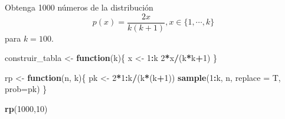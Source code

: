 \documentclass[]{article}
\newenvironment{Shaded}{\begin{snugshade}}{\end{snugshade}}
\newcommand{\ControlFlowTok}[1]{\textcolor[rgb]{0.13,0.29,0.53}{\textbf{#1}}}
\newcommand{\DataTypeTok}[1]{\textcolor[rgb]{0.13,0.29,0.53}{#1}}
\newcommand{\DecValTok}[1]{\textcolor[rgb]{0.00,0.00,0.81}{#1}}
\newcommand{\KeywordTok}[1]{\textcolor[rgb]{0.13,0.29,0.53}{\textbf{#1}}}
\newcommand{\NormalTok}[1]{#1}
\newcommand{\OperatorTok}[1]{\textcolor[rgb]{0.81,0.36,0.00}{\textbf{#1}}}
\newcommand{\StringTok}[1]{\textcolor[rgb]{0.31,0.60,0.02}{#1}}
\begin{document}
Obtenga 1000 números de la distribución \[
p(x) = \frac{2x}{k(k+1)}, x\in\{1, \cdots, k\}
\] para \(k = 100\).

\begin{Shaded}
\begin{Highlighting}[]
\NormalTok{construir_tabla <-}\StringTok{ }\ControlFlowTok{function}\NormalTok{(k)\{}
\NormalTok{  x <-}\StringTok{ }\DecValTok{1}\OperatorTok{:}\NormalTok{k}
  \DecValTok{2}\OperatorTok{*}\NormalTok{x}\OperatorTok{/}\NormalTok{(k}\OperatorTok{*}\NormalTok{k}\OperatorTok{+}\DecValTok{1}\NormalTok{)}
\NormalTok{\}}

\NormalTok{rp <-}\StringTok{ }\ControlFlowTok{function}\NormalTok{(n, k)\{}
\NormalTok{  pk <-}\StringTok{ }\DecValTok{2}\OperatorTok{*}\DecValTok{1}\OperatorTok{:}\NormalTok{k}\OperatorTok{/}\NormalTok{(k}\OperatorTok{*}\NormalTok{(k}\OperatorTok{+}\DecValTok{1}\NormalTok{))}
  \KeywordTok{sample}\NormalTok{(}\DecValTok{1}\OperatorTok{:}\NormalTok{k, n, }\DataTypeTok{replace =}\NormalTok{ T, }\DataTypeTok{prob=}\NormalTok{pk)}
\NormalTok{\}}

\KeywordTok{rp}\NormalTok{(}\DecValTok{1000}\NormalTok{,}\DecValTok{10}\NormalTok{)}
\end{Highlighting}
\end{Shaded}
\end{document}
